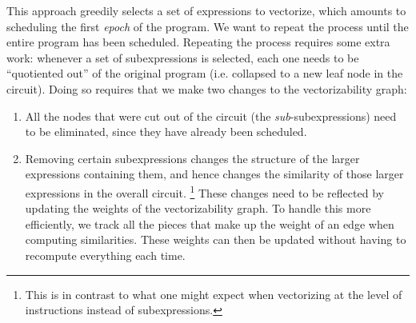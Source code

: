This approach greedily selects a set of expressions to vectorize, which amounts to scheduling the first {\em epoch} of the program. We want to repeat the process until the entire program has been scheduled.
Repeating the process requires some extra work: whenever a set of subexpressions is selected, each one needs to be ``quotiented out'' of the original program (i.e. collapsed to a new leaf node in the circuit).
Doing so requires that we make two changes to the vectorizability graph:
\begin{enumerate}
    \item All the nodes that were cut out of the circuit (the {\em sub}-subexpressions) need to be eliminated, since they have already been scheduled.
    \item Removing certain subexpressions changes the structure of the larger expressions containing them, and hence changes the similarity of those larger  expressions in the overall circuit. \footnote{This is in contrast to what one might expect when vectorizing at the level of instructions instead of subexpressions.} These changes need to be reflected by updating the weights of the vectorizability graph. To handle this more efficiently, we track all the pieces that make up the weight of an edge when computing similarities. These weights can then be updated without having to recompute everything each time. 
\end{enumerate}

